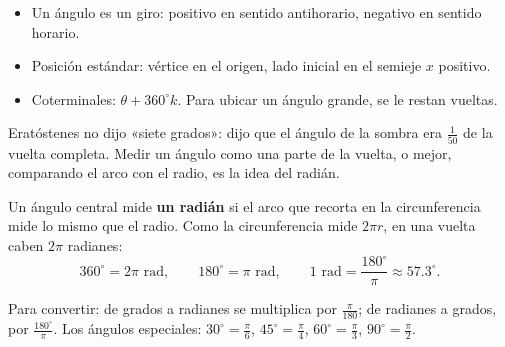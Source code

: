\documentclass[11pt]{article}
\begin{document}
\begin{resumen}
\begin{itemize}
  \item Un ángulo es un giro: positivo en sentido antihorario, negativo en sentido horario.
  \item Posición estándar: vértice en el origen, lado inicial en el semieje $x$ positivo.
  \item Coterminales: $\theta + 360^\circ k$. Para ubicar un ángulo grande, se le restan vueltas.
\end{itemize}
\end{resumen}

\label{tema:radianes}

\begin{hilo}
Eratóstenes no dijo «siete grados»: dijo que el ángulo de la sombra era
$\frac{1}{50}$ de la vuelta completa. Medir un ángulo como una parte de la
vuelta, o mejor, comparando el arco con el radio, es la idea del radián.
\end{hilo}

\begin{definicion}[Radián]
Un ángulo central mide \textbf{un radián} si el arco que recorta en la
circunferencia mide lo mismo que el radio. Como la circunferencia mide $2\pi r$,
en una vuelta caben $2\pi$ radianes:
\[
  360^\circ = 2\pi \text{ rad}, \qquad 180^\circ = \pi \text{ rad}, \qquad
  1 \text{ rad} = \frac{180^\circ}{\pi} \approx \num{57,3}^\circ.
\]
\end{definicion}

\begin{center}
\end{center}

Para convertir: de grados a radianes se multiplica por $\frac{\pi}{180}$; de
radianes a grados, por $\frac{180^\circ}{\pi}$. Los ángulos especiales:
$30^\circ = \frac{\pi}{6}$, $45^\circ = \frac{\pi}{4}$, $60^\circ = \frac{\pi}{3}$,
$90^\circ = \frac{\pi}{2}$.
\end{document}
